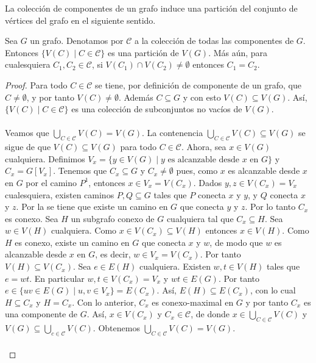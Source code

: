 La colección de componentes de un grafo induce una partición del conjunto de vértices del grafo en el siguiente sentido.
\begin{Prop}\label{Prop:Componentes_particion}
   Sea $G$ un grafo. Denotamos por $\mathcal{C}$ a la colección de todas las componentes de $G$. Entonces $\{V(C)\mid C\in\mathcal{C}\}$ es una partición de $V(G)$. Más aún, para cualesquiera $C_1,C_2\in\mathcal{C}$, si $V(C_1)\cap V(C_2)\ne \emptyset$ entonces $C_1=C_2$.
\end{Prop}
\begin{proof}
   Para todo $C\in\mathcal{C}$ se tiene, por definición de componente de un grafo, que $C\ne \emptyset$, y por tanto $V(C)\ne\emptyset$. Además $C\subseteq G$ y con esto $V(C)\subseteq V(G)$. Así, $\{V(C)\mid C\in\mathcal{C}\}$ es una colección de subconjuntos no vacíos de $V(G)$.\\\\
   Veamos que $\bigcup_{C\in\mathcal{C}}V(C)=V(G)$. La contenencia $\bigcup_{C\in\mathcal{C}}V(C)\subseteq V(G)$ se sigue de que $V(C)\subseteq V(G)$ para todo $C\in\mathcal{C}$. Ahora, sea $x\in V(G)$ cualquiera. Definimos $V_x=\{y\in V(G)\mid y\text{ es alcanzable desde }x\text{ en }G\}$ y $C_x=G[V_x]$. Tenemos que $C_x\subseteq G$ y $C_x\ne \emptyset$ pues, como $x$ es alcanzable desde $x$ en $G$ por el camino $P^1$, entonces $x\in V_x=V(C_x)$. Dados $y,z\in V(C_x)=V_x$ cualesquiera, existen caminos $P,Q\subseteq G$ tales que $P$ conecta $x$ y $y$, y $Q$ conecta $x$ y $z$. Por la  se tiene que existe un camino en $G$ que conecta $y$ y $z$. Por lo tanto $C_x$ es conexo. Sea $H$ un subgrafo conexo de $G$ cualquiera tal que $C_x\subseteq H$. Sea $w\in V(H)$ cualquiera. Como $x\in V(C_x)\subseteq V(H)$ entonces $x\in V(H)$. Como $H$ es conexo, existe un camino en $G$ que conecta $x$ y $w$, de modo que $w$ es alcanzable desde $x$ en $G$, es decir, $w\in V_x=V(C_x)$. Por tanto $V(H)\subseteq V(C_x)$. Sea $e\in E(H)$ cualquiera. Existen $w,t\in V(H)$ tales que $e=wt$. En particular $w,t\in V(C_x)=V_x$  y $wt\in E(G)$. Por tanto $e\in\{uv\in E(G)\mid u,v \in V_x\}=E(C_x)$. Así, $E(H)\subseteq E(C_x)$, con lo cual $H\subseteq C_x$ y $H=C_x$. Con lo anterior, $C_x$ es conexo-maximal en $G$ y por tanto $C_x$ es una componente de $G$. Así, $x\in V(C_x)$ y $C_x\in \mathcal{C}$, de donde $x\in \bigcup_{C\in\mathcal{C}}V(C)$ y $V(G)\subseteq \bigcup_{c\in\mathcal{C}}V(C)$. Obtenemos $\bigcup_{C\in\mathcal{C}}V(C)=V(G)$.\\\\

\end{proof}
